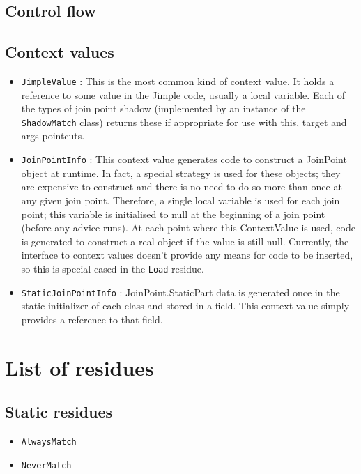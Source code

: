 \documentclass{article}
\begin{document}
\subsection{Control flow}

\subsection{Context values}

\begin{itemize}
\item \verb|JimpleValue| : This is the most common kind of context value.
It holds a reference to some value in the Jimple code, 
usually a local variable. Each of the types of join point shadow 
(implemented by an instance of the \verb|ShadowMatch| class) returns 
these if appropriate for use with this, target and args pointcuts.
\item \verb|JoinPointInfo| : This context value generates code
to construct a JoinPoint object at runtime. In fact, a special strategy
is used for these objects; they are expensive to construct and there is no 
need to do so more than once at any given join point. Therefore, a single
local variable is used for each join point; this variable is initialised
to null at the beginning of a join point (before any advice runs). At each
point where this ContextValue is used, code is generated to construct a real
object if the value is still null. Currently, the interface to context values
doesn't provide any means for code to be inserted, so this is special-cased
in the \verb|Load| residue.
\item \verb|StaticJoinPointInfo| : JoinPoint.StaticPart data is generated once
in the static initializer of each class and stored in a field. This context
value simply provides a reference to that field.
\end{itemize}

\section{List of residues}

\subsection{Static residues}
\begin{itemize}
\item \verb|AlwaysMatch|
\item \verb|NeverMatch|
\end{itemize}
\end{document}
